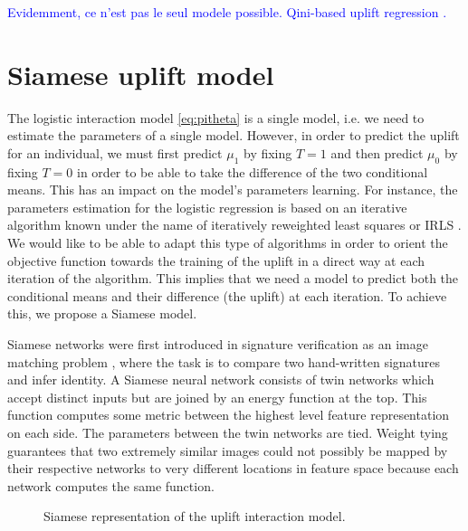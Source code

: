 \documentclass{article}
\begin{document}
\textcolor{blue}{Evidemment, ce n'est pas le seul modele possible. Qini-based uplift regression \citep{belba2019qbased}.}



\section{Siamese uplift model}


The logistic interaction model \eqref{eq:pitheta} is a single model, i.e. we need to estimate the parameters of a single model. However, in order to predict the uplift for an individual, we must first predict $\mu_1$ by fixing $T=1$ and then predict $\mu_0$ by fixing $T=0$ in order to be able to take the difference of the two conditional means. This has an impact on the model's parameters learning. For instance, the parameters estimation for the logistic regression is based on an iterative algorithm known under the name of iteratively reweighted least squares or IRLS \citep{holland1977robust,green1984iteratively,wolke1988iteratively}. We would like to be able to adapt this type of algorithms in order to orient the objective function towards the training of the uplift in a direct way at each iteration of the algorithm. This implies that we need a model to predict both the conditional means and their difference (the uplift) at each iteration. To achieve this, we propose a Siamese model.

Siamese networks were first introduced in signature verification as an image matching problem \citep{bromley1994signature}, where the task is to compare two hand-written signatures and infer identity. A Siamese neural network consists of twin networks which accept distinct inputs but are joined by an energy function at the top. This function computes some metric between the highest level feature representation on each side. The parameters between the twin networks are tied. Weight tying guarantees that two extremely similar images could not possibly be mapped by their respective networks to very different locations in feature space because each network computes the same function. 

\begin{figure}[H]
    \centering
    
    \caption{
    Siamese representation of the uplift interaction model.}
    \label{fig:siamese_network}
\end{figure}
\end{document}
